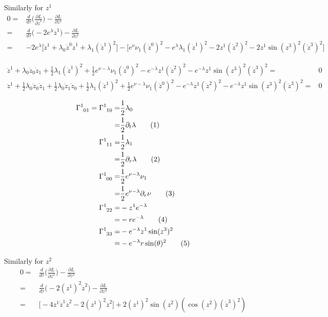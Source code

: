 \documentclass[]{article}
\newcommand\numberthis{\addtocounter{equation}{1}\tag{\theequation}}
\begin{document}
Similarly for $z^1$
\begin{align*}
0=&\frac{d}{d\tau}\big(\frac{\partial L}{\partial \dot z^1}\big)-\frac{\partial L}{\partial z^1}\\
=&\frac{d}{d\tau}\big(-2e^{\lambda}\dot z^1\big)-\frac{\partial L}{\partial z^1}\\
=&-2e^\lambda \big[\ddot z^1 + \lambda_0\dot z^0\dot z^1 + \lambda_1 (\dot z^1)^2\big]-\big[e^\nu \nu_1 (\dot z^0)^2 - e^\lambda \lambda_1(\dot z^1)^2 -2 z^1 (\dot z^2)^2 - 2 z^1 \sin (z^3)^2 (\dot z^3)^2\big]
\end{align*}

\begin{align*}
\ddot z^1 + \lambda_0 \dot z_0 \dot z_1 + \frac{1}{2} \lambda_1 (\dot z^1)^2 + \frac{1}{2}e^{\nu-\lambda}\nu_1(\dot z^0)^2-e^{-\lambda} z^1 (\dot z^2)^2-e^{-\lambda} z^1 \sin (z^3)^2 (\dot z^3)^2 =& 0\\
\ddot z^1 + \frac{1}{2}\lambda_0 \dot z_0 \dot z_1 + \frac{1}{2}\lambda_0 \dot z_1 \dot z_0 + \frac{1}{2} \lambda_1 (\dot z^1)^2 + \frac{1}{2}e^{\nu-\lambda}\nu_1(\dot z^0)^2-e^{-\lambda} z^1 (\dot z^2)^2-e^{-\lambda} z^1 \sin (z^3)^2 (\dot z^3)^2 =& 0
\end{align*}

\begin{align*}
\Gamma\indices{^1_0_1} = \Gamma\indices{^1_1_0} =& \frac{1}{2}\lambda_0\\
=& \frac{1}{2}\partial_t \lambda \numberthis \label{eq:C101}\\
\Gamma\indices{^1_1_1} =& \frac{1}{2} \lambda_1\\
 =& \frac{1}{2} \partial_r \lambda \numberthis \label{eq:C111}\\
 \Gamma\indices{^1_0_0} =& \frac{1}{2}e^{\nu-\lambda}\nu_1\\
 =& \frac{1}{2}e^{\nu-\lambda}\partial_r \nu \numberthis \label{eq:C100}\\
 \Gamma\indices{^1_2_2}=& -z^1 e^{-\lambda} \\
 =& -r e^{-\lambda} \numberthis \label{eq:C122}\\
 \Gamma\indices{^1_3_3} =& -e^{-\lambda} z^1 \sin (z^3)^2 \\
 =& -e^{-\lambda} r \sin (\theta)^2 \numberthis \label{eq:C133}
\end{align*}

Similarly for $z^2$
\begin{align*}
0=&\frac{d}{d\tau}\big(\frac{\partial L}{\partial \dot z^2}\big)-\frac{\partial L}{\partial z^2}\\
=&\frac{d}{d\tau}\big(-2 (z^1)^2 \dot z^2\big)-\frac{\partial L}{\partial z^2}\\
=&\big[-4 z^1 \dot z^1 \dot z^2 - 2(z^1)^2 \ddot z^2\big]+2(z^1)^2 \sin (z^2) (\cos (z^2) (\dot z^3)^2)
\end{align*}
\end{document}
